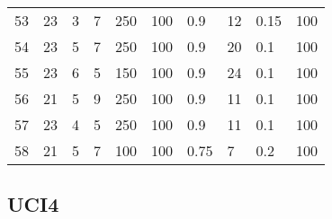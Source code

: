 \begin{center}
\begin{longtable}{l|lllllllll}
        53 & 23 & 3 & 7 & 250 & 100 & 0.9 & 12 & 0.15 & 100 \\ 
        54 & 23 & 5 & 7 & 250 & 100 & 0.9 & 20 & 0.1 & 100 \\ 
        55 & 23 & 6 & 5 & 150 & 100 & 0.9 & 24 & 0.1 & 100 \\ 
        56 & 21 & 5 & 9 & 250 & 100 & 0.9 & 11 & 0.1 & 100 \\ 
        57 & 23 & 4 & 5 & 250 & 100 & 0.9 & 11 & 0.1 & 100 \\ 
        58 & 21 & 5 & 7 & 100 & 100 & 0.75 & 7 & 0.2 & 100 \\
    \bottomrule[0.5mm]
\end{longtable}
\end{center}

\subsection{UCI4}

